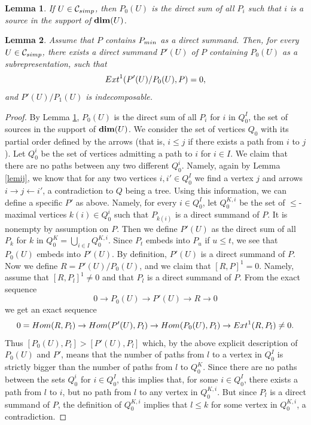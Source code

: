 \documentclass[10pt,a4paper]{amsart}
\newtheorem{lem}{Lemma}
\begin{document}
\begin{lem}\label{lemp0u} If $U\in\mathcal{C}_{\rm simp}$, then $P_0(U)$ is the direct 
sum of all $P_i$ such that $i$ is a source in the support of ${\rm\bf dim}(U)$.
\end{lem}

\begin{lem} Assume that $P$ contains $P_{\rm min}$ as a direct summand. Then, for every $U\in\mathcal{C}_{\rm simp}$, there exists a direct summand $P'(U)$ of $P$ containing $P_0(U)$ as a subrepresentation, 
such that $${\rm Ext}^1(P'(U)/P_0(U),P)=0,$$
and $P'(U)/P_1(U)$ is indecomposable.
\end{lem}

\begin{proof} 
By Lemma \ref{lemp0u}, $P_0(U)$ is the direct sum of all $P_i$ for $i$ in $Q_0^I$, the set of sources in the support of ${\rm\bf dim}(U)$. We consider the set of vertices $Q_0$ with its partial order defined by the arrows (that is, $i\leq j$ if there exists a path from $i$ to $j$). Let $Q_0^i$ be the set of vertices admitting a path to $i$ for $i\in I$. We claim that there are no paths between any two different $Q_0^i$. Namely, again by Lemma \ref{lemij}, we know that for any two vertices $i,i'\in Q_0^I$ we find a vertex $j$ and arrows $i\rightarrow j\leftarrow i'$, a contradiction to $Q$ being a tree. Using this information, we can define a specific $P'$ as above. Namely, for every $i\in Q_0^I$, let $Q_0^{K,i}$ be the set of $\leq$-maximal vertices $k(i)\in Q_0^i$ such that $P_{k(i)}$ is a direct summand of $P$. It is nonempty by assumption on $P$. Then we define $P'(U)$ as the direct sum of all $P_k$ for $k$ in $Q_0^K=\bigcup_{i\in I}Q_0^{K,i}$. Since $P_t$ embeds into $P_u$ if $u\leq t$, we see that $P_0(U)$ embeds into $P'(U)$. By definition, $P'(U)$ is a direct summand of $P$. Now we define $R=P'(U)/P_0(U)$, and we claim that $[R,P]^1=0$. Namely, assume that $[R,P_l]^1\not=0$ and that $P_l$ is a direct summand of $P$. From the exact sequence
$$0\rightarrow P_0(U)\rightarrow P'(U)\rightarrow R\rightarrow 0$$
we get an exact sequence
$$
0={\rm Hom}(R,P_l)\rightarrow{\rm Hom}(P'(U),P_l)\rightarrow{\rm Hom}(P_0(U),P_l)\rightarrow{\rm Ext}^1(R,P_l)\not=0.
$$
Thus $[P_0(U),P_l]>[P'(U),P_l]$ which, by the above explicit description of $P_0(U)$ and $P'$, 
means that the number of paths from $l$ to a vertex in $Q_0^I$ is strictly bigger than the number 
of paths from $l$ to $Q_0^K$. Since there are no paths between the sets $Q_0^i$ for $i\in Q_0^I$, 
this implies that, for some $i\in Q_0^I$, there exists a path from $l$ to $i$, but no path from $l$ 
to any vertex in $Q_0^{K,i}$. But since $P_l$ is a direct summand of $P$, the definition of $Q_0^{K,i}$ implies that $l\leq k$ for some vertex in $Q_0^{K,i}$, a contradiction.


\end{proof}
\end{document}
